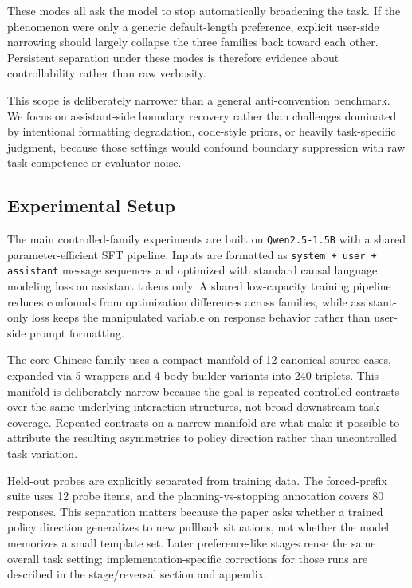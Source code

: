 \documentclass[11pt]{article}
\begin{document}
These modes all ask the model to stop automatically broadening the task. If the phenomenon were only a generic default-length preference, explicit user-side narrowing should largely collapse the three families back toward each other. Persistent separation under these modes is therefore evidence about controllability rather than raw verbosity.

This scope is deliberately narrower than a general anti-convention benchmark. We focus on assistant-side boundary recovery rather than challenges dominated by intentional formatting degradation, code-style priors, or heavily task-specific judgment, because those settings would confound boundary suppression with raw task competence or evaluator noise.

\subsection{Experimental Setup}

The main controlled-family experiments are built on \texttt{Qwen2.5-1.5B} with a shared parameter-efficient SFT pipeline. Inputs are formatted as \texttt{system + user + assistant} message sequences and optimized with standard causal language modeling loss on assistant tokens only. A shared low-capacity training pipeline reduces confounds from optimization differences across families, while assistant-only loss keeps the manipulated variable on response behavior rather than user-side prompt formatting.

The core Chinese family uses a compact manifold of 12 canonical source cases, expanded via 5 wrappers and 4 body-builder variants into 240 triplets. This manifold is deliberately narrow because the goal is repeated controlled contrasts over the same underlying interaction structures, not broad downstream task coverage. Repeated contrasts on a narrow manifold are what make it possible to attribute the resulting asymmetries to policy direction rather than uncontrolled task variation.

Held-out probes are explicitly separated from training data. The forced-prefix suite uses 12 probe items, and the planning-vs-stopping annotation covers 80 responses. This separation matters because the paper asks whether a trained policy direction generalizes to new pullback situations, not whether the model memorizes a small template set. Later preference-like stages reuse the same overall task setting; implementation-specific corrections for those runs are described in the stage/reversal section and appendix.
\end{document}
